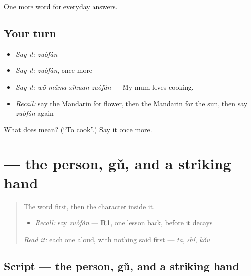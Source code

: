 \begin{grammarlens}[title={What you've built}]
One more word for everyday answers.
\end{grammarlens}

\subsection*{Your turn}
\begin{itemize}
\raggedright
  \item \emph{Say it:} \emph{zuòfàn}
  \item \emph{Say it:} \emph{zuòfàn}, once more
  \item \emph{Say it:} \emph{wǒ māma xǐhuan zuòfàn} — My mum loves cooking.
  \item \emph{Recall:} say the Mandarin for flower, then the Mandarin for the sun, then say \emph{zuòfàn} again
\end{itemize}

\begin{tcolorbox}[breakable,colback=teal!4,colframe=teal!35!black,title={Before you move on}]
What does  mean? (\textquotedblleft{}To cook\textquotedblright{}.) Say it once more.
\end{tcolorbox}
\section[\texorpdfstring{\zh{做} (zuò)}{做 (zuò)}]{ — the person, gǔ, and a striking hand}

\label{lesson:ZH-W69-zuo-make}



\begin{quote}
The word first, then the character inside it.

\begin{itemize}
\raggedright
  \item \emph{Recall:} say \emph{zuòfàn} — \textbf{R1}, one lesson back, before it decays
\end{itemize}

\begin{quote}
  
\end{quote}

\emph{Read it:} each one aloud, with nothing said first — \emph{tā}, \emph{shí}, \emph{kǒu}
\end{quote}

\subsection*{Script — the person, gǔ, and a striking hand}


